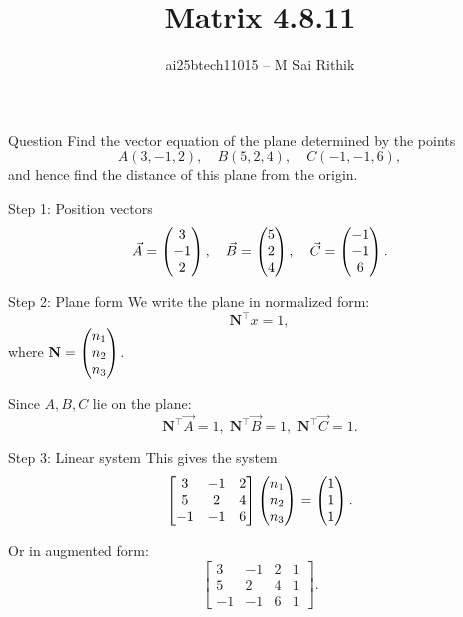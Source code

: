 \documentclass[12pt]{beamer}
\title{Matrix 4.8.11}
\author{ai25btech11015 -- M Sai Rithik}
\date{}
\begin{document}
\maketitle

\begin{frame}{Question}
Find the vector equation of the plane determined by the points
\[
A(3,-1,2),\quad B(5,2,4),\quad C(-1,-1,6),
\]
and hence find the distance of this plane from the origin.
\end{frame}

\begin{frame}{Step 1: Position vectors}
\[
\Vec{A} = \begin{pmatrix}3\\-1\\2\end{pmatrix},\quad
\Vec{B} = \begin{pmatrix}5\\2\\4\end{pmatrix},\quad
\Vec{C} = \begin{pmatrix}-1\\-1\\6\end{pmatrix}.
\]
\end{frame}

\begin{frame}{Step 2: Plane form}
We write the plane in normalized form:
\[
\mathbf{N}^{\!\top} x = 1,
\]
where \(\mathbf{N} = \begin{pmatrix}n_1\\n_2\\n_3\end{pmatrix}\).

Since \(A,B,C\) lie on the plane:
\[
\mathbf{N}^{\!\top}\Vec{A} = 1,\;
\mathbf{N}^{\!\top}\Vec{B} = 1,\;
\mathbf{N}^{\!\top}\Vec{C} = 1.
\]
\end{frame}

\begin{frame}{Step 3: Linear system}
This gives the system
\[
\begin{bmatrix}
3 & -1 & 2\\
5 & 2 & 4\\
-1 & -1 & 6
\end{bmatrix}
\begin{pmatrix}n_1\\n_2\\n_3\end{pmatrix}
=
\begin{pmatrix}1\\1\\1\end{pmatrix}.
\]

Or in augmented form:
\[
\left[
\begin{array}{ccc|c}
3 & -1 & 2 & 1\\
5 & 2 & 4 & 1\\
-1 & -1 & 6 & 1
\end{array}
\right].
\]
\end{frame}
\end{document}
